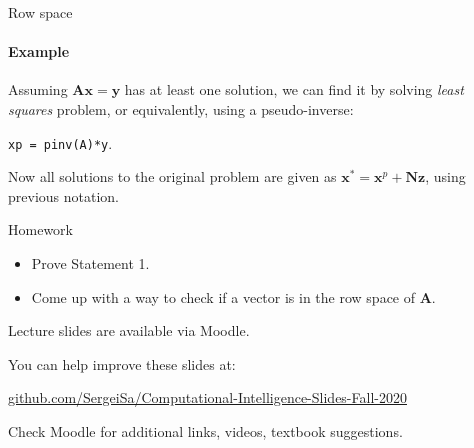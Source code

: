 \documentclass{beamer}
\begin{document}
\begin{frame}{Row space}
\framesubtitle{Example}
\begin{flushleft}

Assuming $\mathbf{A} \mathbf{x} = \mathbf{y}$ has at least one solution, we can find it by solving \emph{least squares} problem, or equivalently, using a pseudo-inverse:

\bigskip

\texttt{xp = pinv(A)*y}.

\bigskip

Now all solutions to the original problem are given as $\mathbf{x}^* = \mathbf{x}^p + \mathbf{N} \mathbf{z}$, using previous notation.

\end{flushleft}
\end{frame}



\begin{frame}{Homework}
\begin{flushleft}

\begin{itemize}
\item Prove Statement 1.
\item Come up with a way to check if a vector is in the row space of $\mathbf{A}$.
\end{itemize}

\end{flushleft}
\end{frame}




\begin{frame}
\centerline{Lecture slides are available via Moodle.}
\bigskip
\centerline{You can help improve these slides at:}

\centerline{\href{https://github.com/SergeiSa/Computational-Intelligence-Slides-Fall-2020}{github.com/SergeiSa/Computational-Intelligence-Slides-Fall-2020}}


\bigskip
\centerline{Check Moodle for additional links, videos, textbook suggestions.}
\end{frame}
\end{document}
